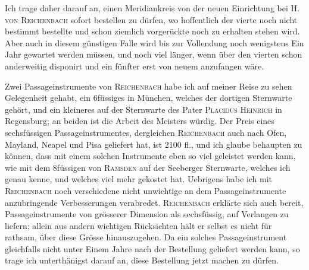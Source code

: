 Ich trage daher darauf an, einen Meridiankreis von der neuen Einrichtung bei H. \textsc{von Reichenbach} sofort bestellen zu dürfen, wo hoffentlich der vierte noch nicht bestimmt bestellte und schon ziemlich vorgerückte noch zu erhalten stehen wird. Aber auch in diesem günstigen Falle wird bis zur Vollendung noch wenigstens Ein Jahr gewartet werden müssen, und noch viel länger, wenn über den vierten schon anderweitig disponirt und ein fünfter erst von neuem anzufangen wäre.
\begin{center}\end{center}
\noindent\hspace*{\parindent}Zwei Passageinstrumente von \textsc{Reichenbach} habe ich auf meiner Reise zu sehen Gelegenheit gehabt, ein 6füssiges in München, welches der dortigen Sternwarte gehört, und ein kleineres auf der Sternwarte des Pater \textsc{Placidus Heinrich} in Regensburg; an beiden ist die Arbeit des Meisters würdig. Der Preis eines sechsfüssigen Passageinstrumentes, dergleichen \textsc{Reichenbach} auch nach Ofen, Mayland, Neapel und Pisa geliefert hat, ist 2100 fl., und ich glaube behaupten zu können, dass mit einem solchen Instrumente eben so viel geleistet werden kann, wie mit dem 8füssigen von \textsc{Ramsden} auf der Seeberger Sternwarte, welches ich genau kenne, und welches viel mehr gekostet hat. Uebrigens habe ich mit \textsc{Reichenbach} noch verschiedene nicht unwichtige an dem Passageinstrumente anzubringende Verbesserungen verabredet. \textsc{Reichenbach} erklärte sich auch bereit, Passageinstrumente von grösserer Dimension als sechsfüssig, auf Verlangen zu liefern; allein aus andern wichtigen Rücksichten hält er selbst es nicht für rathsam, über diese Grösse hinauszugehen. Da ein solches Passageinstrument gleichfalls nicht unter Einem Jahre nach der Bestellung geliefert werden kann, so trage ich unterthänigst darauf an, diese Bestellung jetzt machen zu dürfen.
\clearpage{}
\begin{center}\par
{}\end{center}
